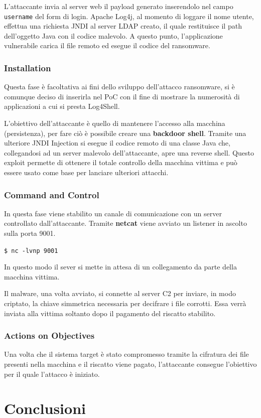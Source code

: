 \documentclass[a4paper, 12pt]{article}
\begin{document}
L'attaccante invia al server web il payload generato inserendolo nel campo \verb!username! del form di login.
Apache Log4j, al momento di loggare il nome utente, effettua una richiesta JNDI al server LDAP creato, il quale restituisce il path dell'oggetto Java con il codice malevolo.
A questo punto, l'applicazione vulnerabile carica il file remoto ed esegue il codice del ransomware.

\subsubsection{Installation}
Questa fase è facoltativa ai fini dello sviluppo dell'attacco ransomware, si è comunque deciso di inserirla nel PoC con il fine di mostrare la numerosità di applicazioni a cui si presta Log4Shell.

L’obiettivo dell'attaccante è quello di mantenere l’accesso alla macchina (persistenza), per fare ciò è possibile creare una \textbf{backdoor shell}.
Tramite una ulteriore JNDI Injection si esegue il codice remoto di una classe Java che, collegandosi ad un server malevolo dell'attaccante, apre una reverse shell.
Questo exploit permette di ottenere il totale controllo della macchina vittima e può essere usato come base per lanciare ulteriori attacchi.


\subsubsection{Command and Control}
In questa fase viene stabilito un canale di comunicazione con un server controllato dall’attaccante. 
Tramite \textbf{netcat} viene avviato un listener in ascolto sulla porta 9001.
\begin{center}
    \verb!$ nc -lvnp 9001!
\end{center}
In questo modo il sever si mette in attesa di un collegamento da parte della macchina vittima.

Il malware, una volta avviato, si connette al server C2 per inviare, in modo criptato, la chiave simmetrica necessaria per decifrare i file corrotti. Essa verrà inviata alla vittima soltanto dopo il pagamento del riscatto stabilito.


\subsubsection{Actions on Objectives}
Una volta che il sistema target è stato compromesso tramite la cifratura dei file presenti nella macchina e il riscatto viene pagato, l'attaccante consegue l’obiettivo per il quale l’attacco è iniziato.

\newpage

\section{Conclusioni}

\newpage


\nocite{*}

\end{document}
